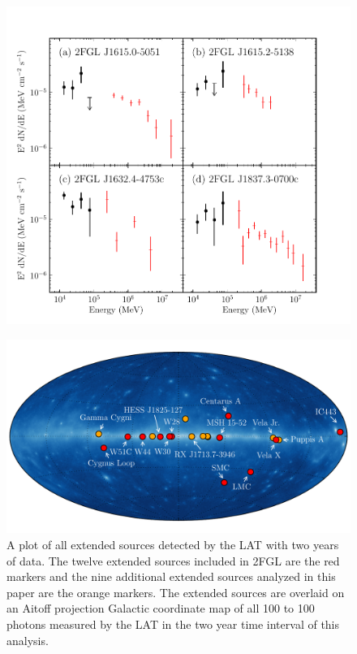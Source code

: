 \documentclass[12pt,preprint]{aastex}
\newcommand{\mev}{\text{MeV}\xspace}
\newcommand{\gev}{\text{GeV}\xspace}
\begin{document}
\clearpage
\begin{figure}
  \begin{center}
    \includegraphics{summary_plots/hess_seds.pdf}
    \end{center}
    \caption{
    }\label{hess_seds}
  \end{figure}

\clearpage
\begin{figure}
  \begin{center}
    \includegraphics{summary_plots/allsky_extended_sources.pdf}
    \end{center}
    \caption{A plot of all \gev extended sources detected by the LAT
    with two years of data.  The twelve extended sources included in
    2FGL are the red markers and the nine additional
    extended sources analyzed in this paper are the orange markers. The
    extended sources are overlaid on an Aitoff projection Galactic
    coordinate map of all 100 \mev to 100 \gev photons measured by the
    LAT in the two year time interval of this analysis.
    }\label{allsky_extended_sources}
  \end{figure}
\end{document}

